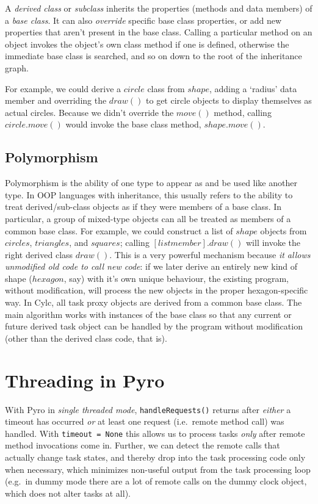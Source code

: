 \documentclass[11pt,a4paper]{article}
\begin{document}
A {\em derived class} or {\em subclass} inherits the properties (methods
and data members) of a {\em base class}. It can also {\em override}
specific base class properties, or add new properties that aren't
present in the base class. Calling a particular method on an object
invokes the object's own class method if one is defined, otherwise the
immediate base class is searched, and so on down to the root of the
inheritance graph. 

For example, we could derive a $circle$ class from $shape$, adding a
`radius' data member and overriding the $draw()$ to get circle objects
to display themselves as actual circles.  Because we didn't override the
$move()$ method, calling $circle.move()$ would invoke the base class
method, $shape.move()$. 


\subsection{Polymorphism}

Polymorphism is the ability of one type to appear as and be used like
another type.  In OOP languages with inheritance, this usually refers to
the ability to treat derived/sub-class objects as if they were members
of a base class.  In particular, a group of mixed-type objects can all
be treated as members of a common base class. For example, we could
construct a list of $shape$ objects from $circles$, $triangles$, and
$squares$; calling $[list member].draw()$ will invoke the right derived
class $draw()$. This is a very powerful mechanism because {\em it allows
unmodified old code to call new code}: if we later derive an entirely
new kind of shape ($hexagon$, say) with it's own unique behaviour, the
existing program, without modification, will process the new objects in
the proper hexagon-specific way.  In Cylc, all task proxy objects are
derived from a common base class. The main algorithm works with
instances of the base class so that any current or future derived task
object can be handled by the program without modification (other than
the derived class code, that is).


\section{Threading in Pyro} \label{pyro-appendix}

With Pyro in {\em single threaded mode}, \verb#handleRequests()# returns
after {\em either} a timeout has occurred {\em or} at least one request
(i.e.\ remote method call) was handled. With \verb#timeout = None# this
allows us to process tasks {\em only} after remote method invocations
come in.  Further, we can detect the remote calls that actually change
task states, and thereby drop into the task processing code only when
necessary, which minimizes non-useful output from the task processing
loop (e.g.\ in dummy mode there are a lot of remote calls on the dummy
clock object, which does not alter tasks at all). 
\end{document}
